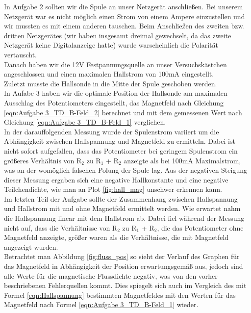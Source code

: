 \documentclass[12pt]{scrartcl}
\begin{document}
In Aufgabe 2 sollten wir die Spule an unser Netzgerät anschließen. Bei unserem Netzgerät war es nicht möglich einen Strom von einem Ampere einzustellen und wir mussten es mit einem anderen tauschen. Beim Anschließen des zweiten bzw. dritten Netzgerätes (wir haben insgesamt dreimal gewechselt, da das zweite Netzgerät keine Digitalanzeige hatte) wurde warscheinlich die Polarität vertauscht.\\
Danach haben wir die 12V Festpannungsquelle an unser Versuchskästchen angeschlossen und einen maximalen Hallstrom von 100mA eingestellt.\\
Zuletzt musste die Hallsonde in die Mitte der Spule geschoben werden.\\
In Aufabe 3 haben wir die optimale Position der Hallsonde am maximalen Ausschlag des Potentiometers eingestellt, das Magnetfeld nach Gleichung \ref{eqn:Aufgabe 3_TD_B-Feld_2} berechnet und mit dem gemessenen Wert nach Gleichung \ref{eqn:Aufgabe 3_TD_B-Feld_1} verglichen.\\
In der darauffolgenden Messung wurde der Spulenstrom variiert um die Abhängigkeit zwischen Hallspannung und Magnetfeld zu ermitteln. Dabei ist nicht sofort aufgefallen, dass das Potentiometer bei geringem Spulenstrom ein größeres Verhältnis von R$_2$ zu R$_1$ + R$_2$ anzeigte als bei 100mA Maximalstrom, was an der womöglich falschen Polung der Spule lag. Aus der negativen Steigung dieser Messung ergaben sich eine negative Hallkonstante und eine negative Teilchendichte, wie man an Plot \ref{fig:hall_mag}
unschwer erkennen kann.\\
Im letzten Teil der Aufgabe sollte der Zusammenhang zwischen Hallspannung und Hallstrom mit und ohne Magnetfeld ermittelt werden. Wie erwartet nahm die Hallspannung linear mit dem Hallstrom ab. Dabei fiel während der Messung nicht auf, dass die Verhältnisse von R$_2$ zu R$_1$ + R$_2$, die das Potentiometer ohne Magnetfeld anzeigte, größer waren als die Verhältnisse, die mit Magnetfeld angezeigt wurden.\\
Betrachtet man Abbildung \ref{fig:fluss_pos} so sieht der Verlauf des Graphen für das Magnetfeld in Abhängigkeit der Position erwartungsgemäß aus, jedoch sind alle Werte für die magnetische Flussdichte negativ, was von den vorher beschriebenen Fehlerquellen kommt. Dies spiegelt sich auch im Vergleich des mit Formel \ref{eqn:Hallspannung} bestimmten Magnetfeldes mit den Werten für das Magnetfeld nach Formel \ref{eqn:Aufgabe 3_TD_B-Feld_1} wieder.\\
\end{document}
